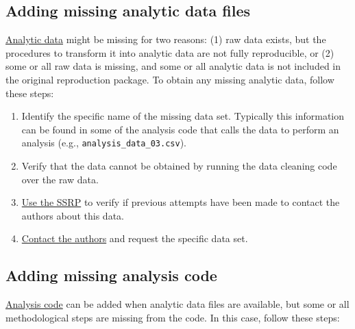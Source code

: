 \documentclass[]{book}
\providecommand{\tightlist}{%
  \setlength{\itemsep}{0pt}\setlength{\parskip}{0pt}}
\begin{document}
\hypertarget{ad}{%
\subsection{Adding missing analytic data files}\label{ad}}

\protect\hyperlink{describe-inputs}{Analytic data} might be missing for two reasons: (1) raw data exists, but the procedures to transform it into analytic data are not fully reproducible, or (2) some or all raw data is missing, and some or all analytic data is not included in the original reproduction package. To obtain any missing analytic data, follow these steps:

\begin{enumerate}
\def\labelenumi{\arabic{enumi}.}
\tightlist
\item
  Identify the specific name of the missing data set. Typically this information can be found in some of the analysis code that calls the data to perform an analysis (e.g., \texttt{analysis\_data\_03.csv}).\\
\item
  Verify that the data cannot be obtained by running the data cleaning code over the raw data.\\
\item
  \href{ADD\%20LINK}{Use the SSRP} to verify if previous attempts have been made to contact the authors about this data.\\
\item
  \protect\hyperlink{tips-for-communication}{Contact the authors} and request the specific data set.
\end{enumerate}

\hypertarget{ac}{%
\subsection{Adding missing analysis code}\label{ac}}

\protect\hyperlink{describe-inputs}{Analysis code} can be added when analytic data files are available, but some or all methodological steps are missing from the code. In this case, follow these steps:
\end{document}
